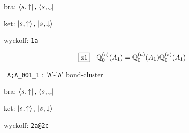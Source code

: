 \documentclass[fleqn,10pt,landscape]{jsarticle}
\begin{document}
\noindent\quad * bra: $\bra{s_{},\uparrow},\, \bra{s_{},\downarrow}$

\noindent\quad * ket: $\ket{s_{},\uparrow},\, \ket{s_{},\downarrow}$

\noindent\quad * wyckoff: \texttt{1a}

\begin{dmath*}
\hspace*{3mm}\fbox{z1}\quad \mathbb{Q}_{0}^{(c)}(A_{1})=\mathbb{Q}_{0}^{(a)}(A_{1}) \mathbb{Q}_{0}^{(s)}(A_{1})
\end{dmath*}
\vspace{5mm}

\noindent\textbullet\, \texttt{A;A_001_1} : '\texttt{A}'-'\texttt{A}' bond-cluster

\noindent\quad * bra: $\bra{s_{},\uparrow},\, \bra{s_{},\downarrow}$

\noindent\quad * ket: $\ket{s_{},\uparrow},\, \ket{s_{},\downarrow}$

\noindent\quad * wyckoff: \texttt{2a@2c}
\end{document}

